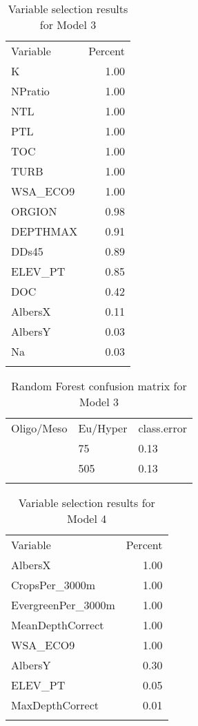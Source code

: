 \documentclass[11pt,]{article}
\begin{document}
\begin{longtable}[c]{@{}lr@{}}
\toprule\addlinespace
Variable & Percent
\\\addlinespace
\midrule\endhead
K & 1.00
\\\addlinespace
NPratio & 1.00
\\\addlinespace
NTL & 1.00
\\\addlinespace
PTL & 1.00
\\\addlinespace
TOC & 1.00
\\\addlinespace
TURB & 1.00
\\\addlinespace
WSA\_ECO9 & 1.00
\\\addlinespace
ORGION & 0.98
\\\addlinespace
DEPTHMAX & 0.91
\\\addlinespace
DDs45 & 0.89
\\\addlinespace
ELEV\_PT & 0.85
\\\addlinespace
DOC & 0.42
\\\addlinespace
AlbersX & 0.11
\\\addlinespace
AlbersY & 0.03
\\\addlinespace
Na & 0.03
\\\addlinespace
\bottomrule
\addlinespace
\caption{Variable selection results for Model
3\label{tab:VarSel_Model3}}
\end{longtable}

\newpage

\begin{longtable}[c]{@{}lll@{}}
\toprule\addlinespace
Oligo/Meso & Eu/Hyper & class.error
\\\addlinespace
\midrule\endhead
485 & 75 & 0.13
\\\addlinespace
77 & 505 & 0.13
\\\addlinespace
\bottomrule
\addlinespace
\caption{Random Forest confusion matrix for Model
3\label{tab:Confusion_Model3}}
\end{longtable}

\newpage

\begin{longtable}[c]{@{}lr@{}}
\toprule\addlinespace
Variable & Percent
\\\addlinespace
\midrule\endhead
AlbersX & 1.00
\\\addlinespace
CropsPer\_3000m & 1.00
\\\addlinespace
EvergreenPer\_3000m & 1.00
\\\addlinespace
MeanDepthCorrect & 1.00
\\\addlinespace
WSA\_ECO9 & 1.00
\\\addlinespace
AlbersY & 0.30
\\\addlinespace
ELEV\_PT & 0.05
\\\addlinespace
MaxDepthCorrect & 0.01
\\\addlinespace
\bottomrule
\addlinespace
\caption{Variable selection results for Model
4\label{tab:VarSel_Model4}}
\end{longtable}
\end{document}
